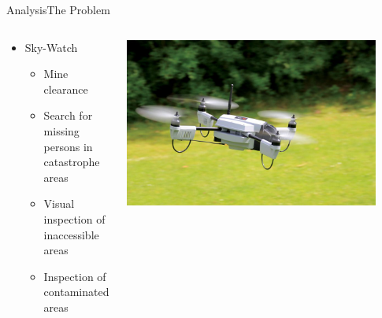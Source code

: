 \begin{frame}{Analysis}{The Problem}
    \begin{columns}[T]
        \begin{column}{.5\textwidth}
            \begin{itemize}
                \item Sky-Watch
                \begin{itemize}
                    \item Mine clearance
                    \item Search for missing persons in catastrophe areas
                    \item Visual inspection of inaccessible areas
                    \item Inspection of contaminated areas
                \end{itemize}
            \end{itemize}
        \end{column}
        \begin{column}{.5\textwidth}
            \includegraphics[width=0.9\textwidth]{images/sky-watch_drone.jpg}
        \end{column}
    \end{columns}
\end{frame}

